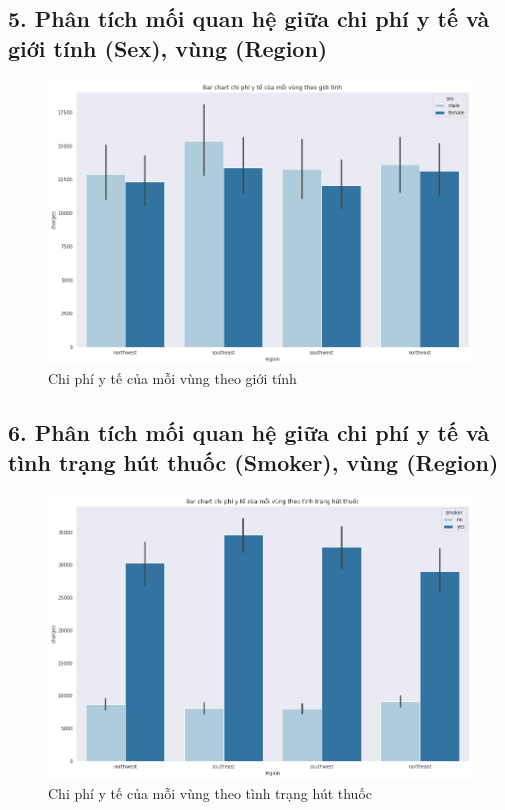 \documentclass{article}
\begin{document}
	\subsection{5. Phân tích mối quan hệ giữa chi phí y tế và giới tính (Sex), vùng (Region)}
	\begin{figure}[H]
		\centering
		\includegraphics[width=1\textwidth]{images/bar_chart_medical_charges_region_sex.png}
		\caption{Chi phí y tế của mỗi vùng theo giới tính}
		\label{fig:writing-thesis}
	\end{figure}
	
	\subsection{6. Phân tích mối quan hệ giữa chi phí y tế và tình trạng hút thuốc (Smoker), vùng (Region)}
	\begin{figure}[H]
		\centering
		\includegraphics[width=1\textwidth]{images/bar_chart_medical_charges_region_smoker.png}
		\caption{Chi phí y tế của mỗi vùng theo tình trạng hút thuốc}
		\label{fig:writing-thesis}
	\end{figure}
	
\end{document}
